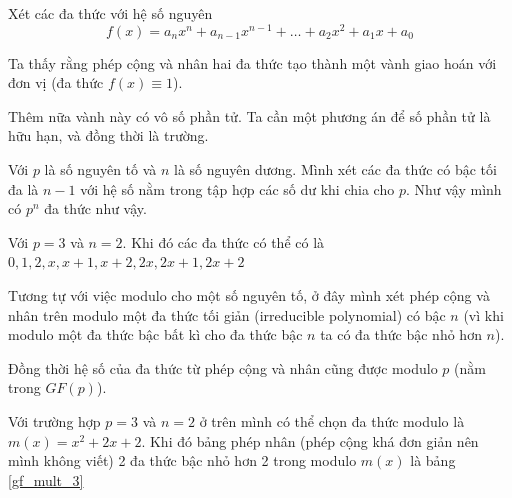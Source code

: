 Xét các đa thức với hệ số nguyên
\begin{equation*}
    f(x) = a_n x^n + a_{n-1} x^{n-1} + \ldots + a_2 x^2 + a_1 x + a_0
\end{equation*}

Ta thấy rằng phép cộng và nhân hai đa thức tạo thành một vành giao hoán với đơn vị (đa thức $f(x) \equiv 1$).

Thêm nữa vành này có vô số phần tử. Ta cần một phương án để số phần tử là hữu hạn, và đồng thời là trường.

Với $p$ là số nguyên tố và $n$ là số nguyên dương. Mình xét các đa thức có bậc tối đa là $n-1$ với hệ số nằm trong tập hợp các số dư khi chia cho $p$. Như vậy mình có $p^n$ đa thức như vậy.

\begin{example}
    Với $p=3$ và $n=2$. Khi đó các đa thức có thể có là
    $0, 1, 2, x, x+1, x+2, 2x, 2x+1, 2x+2$
\end{example}

Tương tự với việc modulo cho một số nguyên tố, ở đây mình xét phép cộng và nhân trên modulo một đa thức tối giản (irreducible polynomial) có bậc $n$ (vì khi modulo một đa thức bậc bất kì cho đa thức bậc $n$ ta có đa thức bậc nhỏ hơn $n$). 

Đồng thời hệ số của đa thức từ phép cộng và nhân cũng được modulo $p$ (nằm trong $GF(p)$).

Với trường hợp $p=3$ và $n=2$ ở trên mình có thể chọn đa thức modulo là $m(x) = x^2 + 2x + 2$. Khi đó bảng phép nhân (phép cộng khá đơn giản nên mình không viết) 2 đa thức bậc nhỏ hơn 2 trong modulo $m(x)$ là bảng \ref{gf_mult_3}


